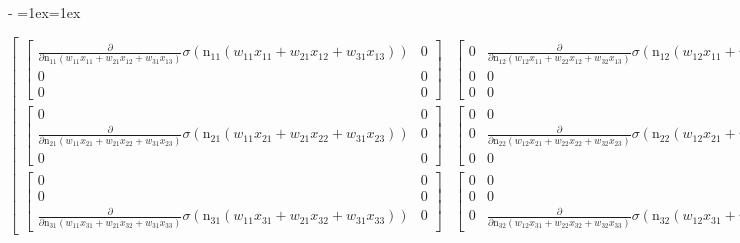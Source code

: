 \documentclass[letterpaper,10pt,english]{sphinxmanual}
\makeatletter
\newenvironment{nbsphinxfancyoutput}{%
    \let\sphinxincludegraphics\nbsphinxincludegraphics
    \nbsphinx@image@maxheight\textheight
    \advance\nbsphinx@image@maxheight -2\fboxsep   %
    \advance\nbsphinx@image@maxheight -2\fboxrule  %
    \advance\nbsphinx@image@maxheight -\baselineskip
\def\nbsphinxfcolorbox{\spx@fcolorbox{nbsphinx-code-border}{white}}%
\def\FrameCommand{\nbsphinxfcolorbox\nbsphinxfancyaddprompt\@empty}%
\def\FirstFrameCommand{\nbsphinxfcolorbox\nbsphinxfancyaddprompt\sphinxVerbatim@Continues}%
\def\MidFrameCommand{\nbsphinxfcolorbox\sphinxVerbatim@Continued\sphinxVerbatim@Continues}%
\def\LastFrameCommand{\nbsphinxfcolorbox\sphinxVerbatim@Continued\@empty}%
\MakeFramed{\advance\hsize-\width\@totalleftmargin\z@\linewidth\hsize\@setminipage}%
\lineskip=1ex\lineskiplimit=1ex\raggedright%
}{\par\unskip\@minipagefalse\endMakeFramed}
\def\nbsphinxfancyaddprompt{\ifvoid\nbsphinxpromptbox\else
    \kern\fboxrule\kern\fboxsep
    \copy\nbsphinxpromptbox
    \kern-\ht\nbsphinxpromptbox\kern-\dp\nbsphinxpromptbox
    \kern-\fboxsep\kern-\fboxrule\nointerlineskip
    \fi}
\newcommand*{\nbsphinxincludegraphics}[2][]{%
    \gdef\spx@includegraphics@options{#1}%
    \setbox\spx@image@box\hbox{\texttt{[image: \#2]}}%
    \in@false
    \ifdim \wd\spx@image@box>\linewidth
      \g@addto@macro\spx@includegraphics@options{,width=\linewidth}%
      \in@true
    \fi
    \ifdim \ht\spx@image@box>\nbsphinx@image@maxheight
      \g@addto@macro\spx@includegraphics@options{,height=\nbsphinx@image@maxheight}%
      \in@true
    \fi
    \ifin@
      \g@addto@macro\spx@includegraphics@options{,keepaspectratio}%
    \fi
    \setbox\spx@image@box\box\voidb@x %
    \expandafter\includegraphics\expandafter[\spx@includegraphics@options]{#2}%
}%
\makeatother
\begin{document}
\begin{nbsphinxfancyoutput}
$\displaystyle \left[\begin{matrix}\left[\begin{matrix}\frac{\partial}{\partial \operatorname{n_{11}}{\left(w_{11} x_{11} + w_{21} x_{12} + w_{31} x_{13} \right)}} \sigma{\left(\operatorname{n_{11}}{\left(w_{11} x_{11} + w_{21} x_{12} + w_{31} x_{13} \right)} \right)} & 0\\0 & 0\\0 & 0\end{matrix}\right] & \left[\begin{matrix}0 & \frac{\partial}{\partial \operatorname{n_{12}}{\left(w_{12} x_{11} + w_{22} x_{12} + w_{32} x_{13} \right)}} \sigma{\left(\operatorname{n_{12}}{\left(w_{12} x_{11} + w_{22} x_{12} + w_{32} x_{13} \right)} \right)}\\0 & 0\\0 & 0\end{matrix}\right]\\\left[\begin{matrix}0 & 0\\\frac{\partial}{\partial \operatorname{n_{21}}{\left(w_{11} x_{21} + w_{21} x_{22} + w_{31} x_{23} \right)}} \sigma{\left(\operatorname{n_{21}}{\left(w_{11} x_{21} + w_{21} x_{22} + w_{31} x_{23} \right)} \right)} & 0\\0 & 0\end{matrix}\right] & \left[\begin{matrix}0 & 0\\0 & \frac{\partial}{\partial \operatorname{n_{22}}{\left(w_{12} x_{21} + w_{22} x_{22} + w_{32} x_{23} \right)}} \sigma{\left(\operatorname{n_{22}}{\left(w_{12} x_{21} + w_{22} x_{22} + w_{32} x_{23} \right)} \right)}\\0 & 0\end{matrix}\right]\\\left[\begin{matrix}0 & 0\\0 & 0\\\frac{\partial}{\partial \operatorname{n_{31}}{\left(w_{11} x_{31} + w_{21} x_{32} + w_{31} x_{33} \right)}} \sigma{\left(\operatorname{n_{31}}{\left(w_{11} x_{31} + w_{21} x_{32} + w_{31} x_{33} \right)} \right)} & 0\end{matrix}\right] & \left[\begin{matrix}0 & 0\\0 & 0\\0 & \frac{\partial}{\partial \operatorname{n_{32}}{\left(w_{12} x_{31} + w_{22} x_{32} + w_{32} x_{33} \right)}} \sigma{\left(\operatorname{n_{32}}{\left(w_{12} x_{31} + w_{22} x_{32} + w_{32} x_{33} \right)} \right)}\end{matrix}\right]\end{matrix}\right]$
\end{nbsphinxfancyoutput}
\end{document}
